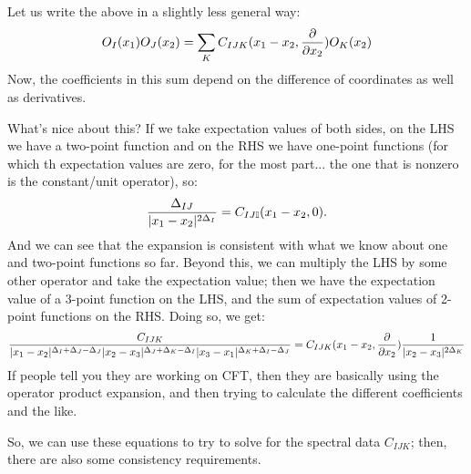 Let us write the above in a slightly less general way:
\begin{equation}
    O_I(x_1)O_J(x_2) = \sum_K C_{IJK}(x_1 - x_2, \frac{\partial }{\partial x_2})O_K(x_2)
\end{equation}
Now, the coefficients in this sum depend on the difference of coordinates as well as derivatives.

What's nice about this? If we take expectation values of both sides, on the LHS we have a two-point function and on the RHS we have one-point functions (for which th expectation values are zero, for the most part... the one that is nonzero is the constant/unit operator), so:
\begin{equation}
    \frac{\Delta_{IJ}}{\lvert x_1 - x_2 \rvert^{2\Delta_I}} = C_{IJ\mathbb{I}}(x_1 - x_2, 0).
\end{equation}
And we can see that the expansion is consistent with what we know about one and two-point functions so far. Beyond this, we can multiply the LHS by some other operator and take the expectation value; then we have the expectation value of a 3-point function on the LHS, and the sum of expectation values of 2-point functions on the RHS. Doing so, we get:
\begin{equation}
    \frac{C_{IJK}}{\lvert x_1 - x_2 \rvert^{\Delta_I + \Delta_J - \Delta_J}\lvert x_2 - x_3 \rvert^{\Delta_J + \Delta_K - \Delta_I}\lvert x_3 - x_1 \rvert^{\Delta_K + \Delta_I - \Delta_J}} = C_{IJK}(x_1 - x_2, \frac{\partial }{\partial x_2})\frac{1}{\lvert x_2 - x_3 \rvert^{2\Delta_K}}
\end{equation}
If people tell you they are working on CFT, then they are basically using the operator product expansion, and then trying to calculate the different coefficients and the like.

So, we can use these equations to try to solve for the spectral data $C_{IJK}$; then, there are also some consistency requirements.

